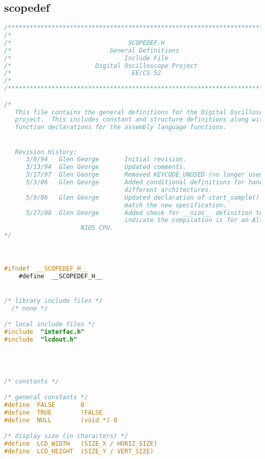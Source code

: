 \subsection{scopedef}
\begin{lstlisting}[language=C]
/****************************************************************************/
/*                                                                          */
/*                                SCOPEDEF.H                                */
/*                           General Definitions                            */
/*                               Include File                               */
/*                       Digital Oscilloscope Project                       */
/*                                 EE/CS 52                                 */
/*                                                                          */
/****************************************************************************/

/*
   This file contains the general definitions for the Digital Oscilloscope
   project.  This includes constant and structure definitions along with the
   function declarations for the assembly language functions.


   Revision History:
      3/8/94   Glen George       Initial revision.
      3/13/94  Glen George       Updated comments.
      3/17/97  Glen George       Removed KEYCODE_UNUSED (no longer used).
      5/3/06   Glen George       Added conditional definitions for handling
                                 different architectures.
      5/9/06   Glen George       Updated declaration of start_sample() to
                                 match the new specification.
      5/27/08  Glen George       Added check for __nios__ definition to also
                                 indicate the compilation is for an Altera
			         NIOS CPU.
*/



#ifndef  __SCOPEDEF_H__
    #define  __SCOPEDEF_H__


/* library include files */
  /* none */

/* local include files */
#include  "interfac.h"
#include  "lcdout.h"




/* constants */

/* general constants */
#define  FALSE       0
#define  TRUE        !FALSE
#define  NULL        (void *) 0

/* display size (in characters) */
#define  LCD_WIDTH   (SIZE_X / HORIZ_SIZE)
#define  LCD_HEIGHT  (SIZE_Y / VERT_SIZE)





\end{lstlisting}

